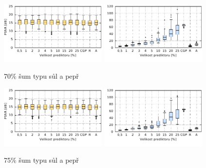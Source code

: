 \begin{figure}[H]
    \centering
    \includegraphics[width=0.475\textwidth]{fig/plot/compare/saltpepper70-100kg-psnrtest.pdf}
    \hskip0.5cm
    \includegraphics[width=0.475\textwidth]{fig/plot/compare/saltpepper70-100kg-usertime.pdf}
    \caption{70\% šum typu sůl a pepř}
\end{figure}

\begin{figure}[H]
    \centering
    \includegraphics[width=0.475\textwidth]{fig/plot/compare/saltpepper75-100kg-psnrtest.pdf}
    \hskip0.5cm
    \includegraphics[width=0.475\textwidth]{fig/plot/compare/saltpepper75-100kg-usertime.pdf}
    \caption{75\% šum typu sůl a pepř}
\end{figure}


